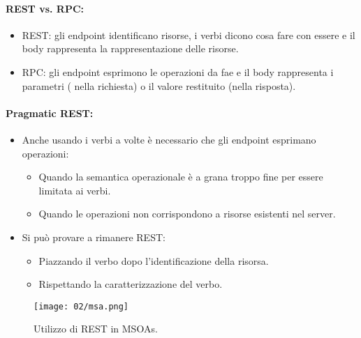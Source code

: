 \paragraph{REST vs. RPC:}

\begin{itemize}
	\item REST: gli endpoint identificano risorse, i verbi dicono cosa fare con essere e il body rappresenta la rappresentazione delle risorse.
	\item RPC: gli endpoint esprimono le operazioni da fae e il body rappresenta i parametri ( nella richiesta) o il valore restituito (nella risposta).
\end{itemize}

\paragraph{Pragmatic REST:}

\begin{itemize}
	\item Anche usando i verbi a volte è necessario che gli endpoint esprimano operazioni:
	      \begin{itemize}
		      \item Quando la semantica operazionale è a grana  troppo fine per essere limitata ai verbi.
		      \item Quando le operazioni non corrispondono a risorse esistenti nel server.
	      \end{itemize}
	\item Si può provare a rimanere REST:
	      \begin{itemize}
		      \item Piazzando il verbo dopo l'identificazione della risorsa.
		      \item Rispettando la caratterizzazione del verbo.
	      \end{itemize}
\end{itemize}


\begin{figure}[h]
	\centering
	\texttt{[image: 02/msa.png]}
	\caption{Utilizzo di REST in MSOAs.}
\end{figure}



